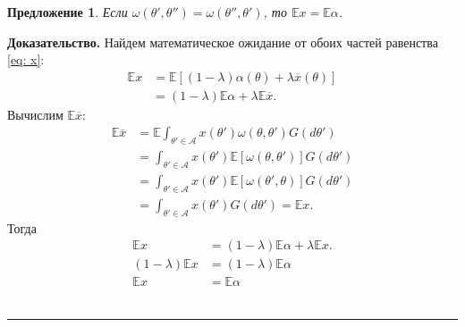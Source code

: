 \documentclass[12pt]{article}
\newtheorem{proposition}{Предложение}
\newenvironment{proof}[1][Доказательство]{\noindent\textbf{#1.} }{\ \rule{0.5em}{0.5em}}
\begin{document}
\begin{proposition}
Если $\omega(\theta', \theta'') = \omega(\theta'', \theta')$,  то $\mathbb{E} x = \mathbb{E} \alpha$.
\end{proposition}
\begin{proof}
Найдем математическое ожидание от обоих частей равенства \eqref{eq: x}:
\begin{align*}
\mathbb{E}x &= \mathbb{E} \left[(1-\lambda)\alpha(\theta) + \lambda \overline{x}(\theta) \right] \\
&= (1-\lambda) \mathbb{E} \alpha + \lambda \mathbb{E}  \overline{x}.
\end{align*}
Вычислим $\mathbb{E} \overline{x}$:
\begin{align*}
\mathbb{E} \overline{x} &= \mathbb{E} \int_{\theta' \in \mathcal{A}} x(\theta') \omega(\theta, \theta') G(d \theta') \\
&=  \int_{\theta' \in \mathcal{A}} x(\theta') \mathbb{E} \left[ \omega(\theta, \theta') \right] G(d \theta') \\ 
&=  \int_{\theta' \in \mathcal{A}} x(\theta') \mathbb{E} \left[ \omega(\theta', \theta) \right] G(d \theta') \\
&=  \int_{\theta' \in \mathcal{A}} x(\theta') G(d \theta') = \mathbb{E} x.
\end{align*}
Тогда 
\begin{align*}
\mathbb{E}x &= (1-\lambda) \mathbb{E} \alpha + \lambda \mathbb{E} x. \\
(1-\lambda)\mathbb{E}x &=(1-\lambda) \mathbb{E}\alpha \\
\mathbb{E}x &=  \mathbb{E}\alpha
\end{align*}
\end{proof}
\end{document}
